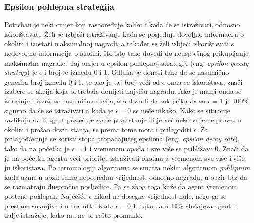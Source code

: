 \subsubsection{Epsilon pohlepna strategija}
Potreban je neki omjer koji raspoređuje koliko i kada će se istraživati, odnosno iskorištavati. Želi se izbjeći istraživanje kada se posjeduje dovoljno informacija o okolini i izostati maksimalnoj nagradi, a također se želi izbjeći iskorištavati s nedovoljno informacija o okolini, što isto tako dovodi do neuspješnog prikupljanje maksimalne nagrade. Taj omjer u epsilon pohlepnoj strategiji (eng. \textit{epsilon greedy strategy}) je $\epsilon$ i broj je između 0 i 1. Odluka se donosi tako da se nasumično generira broj između 0 i 1, te ako je taj broj veći od $\epsilon$ onda se iskorištava, znači izabere se akcija koja bi trebala donijeti najvišu nagradu. Ako je manji onda se istražuje i izvrši se nasumična akcija, što dovodi do zaključka da sa $\epsilon = 1$ je 100\% sigurno da će se istraživati a kada je $\epsilon = 0$ se neće nikako. Kako se situacije razlikuju da li agent posjećuje svoje prvo stanje ili je već neko vrijeme proveo u okolini i prošao dosta stanja, se prema tome mora i prilagoditi $\epsilon$. Za prilagođavanje se koristi stopa propadajućeg epsilona (eng. \textit{epsilon decay rate}), tako da na početku je $\epsilon = 1$ i vremenom opada i sve više se približava 0. Znači da je na početku agentu veći prioritet istraživati okolinu a vremenom sve više i više ju iskorištava. Po terminologiji algoritama se smatra nekim algoritmom \emph{pohlepnim} kada uzme u obzir samo neposrednu vrijednost, odnosno nagradu, u obzir bez da se razmatraju dugoročne posljedice. Pa se zbog toga kaže da agent vremenom postane pohlepan. Najčešće $\epsilon$ nikad ne dosegne vrijednost nule, nego ga se prestane smanjivati u trenutku kada $\epsilon = 0.1$, tako da u 10\% slučajeva agent i dalje istražuje, kako mu ne bi nešto promaklo.

